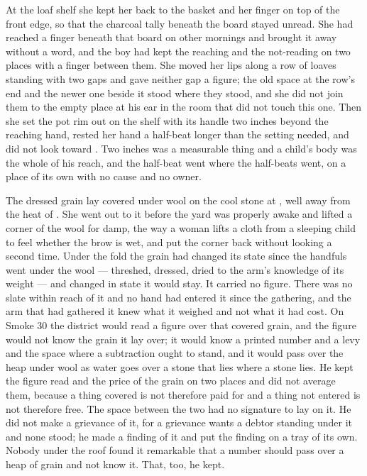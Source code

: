 At the loaf shelf she kept her back to the basket and her finger on top of the front edge, so that the charcoal tally beneath the board stayed unread. She had reached a finger beneath that board on other mornings and brought it away without a word, and the boy had kept the reaching and the not-reading on two places with a finger between them. She moved her lips along a row of loaves standing with two gaps and gave neither gap a figure; the old space at the row's end and the newer one beside it stood where they stood, and she did not join them to the empty place at his ear in the room that did not touch this one. Then she set the pot rim out on the shelf with its handle two inches beyond the reaching hand, rested her hand a half-beat longer than the setting needed, and did not look toward . Two inches was a measurable thing and a child's body was the whole of his reach, and the half-beat went where the half-beats went, on a place of its own with no cause and no owner.

\scenebreak

The dressed grain lay covered under wool on the cool stone at , well away from the heat of . She went out to it before the yard was properly awake and lifted a corner of the wool for damp, the way a woman lifts a cloth from a sleeping child to feel whether the brow is wet, and put the corner back without looking a second time. Under the fold the grain had changed its state since the handfuls went under the wool --- threshed, dressed, dried to the arm's knowledge of its weight --- and changed in state it would stay. It carried no figure. There was no slate within reach of it and no hand had entered it since the gathering, and the arm that had gathered it knew what it weighed and not what it had cost. On Smoke 30 the district would read a figure over that covered grain, and the figure would not know the grain it lay over; it would know a printed number and a levy and the space where a subtraction ought to stand, and it would pass over the heap under wool as water goes over a stone that lies where a stone lies. He kept the figure read and the price of the grain on two places and did not average them, because a thing covered is not therefore paid for and a thing not entered is not therefore free. The space between the two had no signature to lay on it. He did not make a grievance of it, for a grievance wants a debtor standing under it and none stood; he made a finding of it and put the finding on a tray of its own. Nobody under the roof found it remarkable that a number should pass over a heap of grain and not know it. That, too, he kept.

